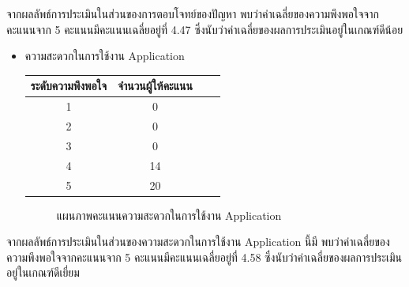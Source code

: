 \documentclass[14pt,oneside,openright,a4paper]{cpe-thai-project}
\begin{document}
จากผลลัพธ์การประเมินในส่วนของการตอบโจทย์ของปัญหา พบว่าค่าเฉลี่ยของความพึงพอใจจากคะแนนจาก 5 คะแนนมีคะแนนเฉลี่ยอยู่ที่ 4.47 ซึ่งนับว่าค่าเฉลี่ยของผลการประเมินอยู่ในเกณฑ์ดีน้อย
\newpage
\begin{itemize}
  \item ความสะดวกในการใช้งาน Application
  \begin{table}[!h]
    \centering
    \captionsetup{justification=centering} %
    \begin{tabular}{|c|c|c|c|}
      \hline
      \multicolumn{1}{|c|}{\cellcolor[HTML]{9FC5E8}ระดับความพึงพอใจ} &
        \multicolumn{1}{c|}{\cellcolor[HTML]{9FC5E8}จำนวนผู้ให้คะแนน} \\ \hline
       1 & 0
         \\ \hline 
       2 & 0
         \\ \hline 
       3 & 0
         \\ \hline 
       4 & 14
         \\ \hline 
       5 & 20
         \\ \hline
    \end{tabular}
    \label{tab:Featuresatisfaction}
  \end{table}
  \begin{figure}[!h]\centering
    \setlength{\fboxrule}{0.5mm} %
    \setlength{\fboxsep}{0.5cm}
    \caption{แผนภาพคะแนนความสะดวกในการใช้งาน Application}\label{fig:NotificationTest}
  \end{figure}
\end{itemize}
จากผลลัพธ์การประเมินในส่วนของความสะดวกในการใช้งาน Application นี้มี พบว่าค่าเฉลี่ยของความพึงพอใจจากคะแนนจาก 5 คะแนนมีคะแนนเฉลี่ยอยู่ที่ 4.58 ซึ่งนับว่าค่าเฉลี่ยของผลการประเมินอยู่ในเกณฑ์ดีเยี่ยม
\newpage
\end{document}
